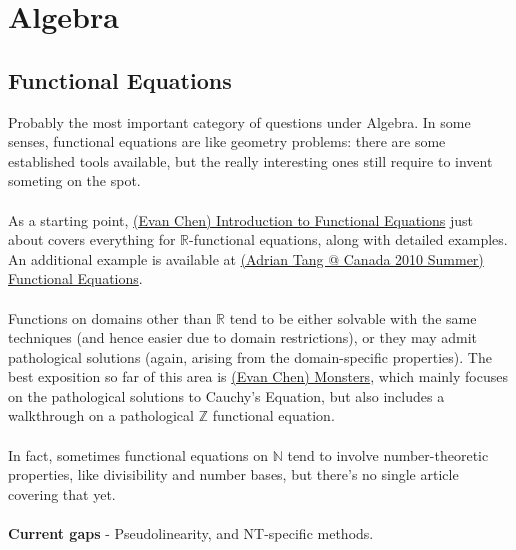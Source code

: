 \documentclass[a4paper]{article}
\begin{document}

\section{Algebra}
	
	\subsection{Functional Equations}
	Probably the most important category of questions under Algebra. In some senses, functional equations are like geometry problems: there are some established tools available, but the really interesting ones still require to invent someting on the spot.\\\\
	As a starting point, \href{run:./F_Algebra/(Evan Chen) Introduction to Functional Equations.pdf}{(Evan Chen) Introduction to Functional Equations} just about covers everything for $\mathbb{R}$-functional equations, along with detailed examples. An additional example is available at  \href{run:./F_Algebra/(Adrian Tang @ Canada 2010 Summer) Functional Equations.pdf}{(Adrian Tang @ Canada 2010 Summer) Functional Equations}.\\\\
	Functions on domains other than $\mathbb{R}$ tend to be either solvable with the same techniques (and hence easier due to domain restrictions), or they may admit pathological solutions (again, arising from the domain-specific properties). The best exposition so far of this area is \href{run:./F_Algebra/(Evan Chen) Monsters.pdf}{(Evan Chen) Monsters}, which mainly focuses on the pathological solutions to Cauchy's Equation, but also includes a walkthrough on a pathological $\mathbb{Z}$ functional equation.\\\\
	In fact, sometimes functional equations on $\mathbb{N}$ tend to involve number-theoretic properties, like divisibility and number bases, but there's no single article covering that yet.\\\\
	\textbf{Current gaps} - Pseudolinearity, and NT-specific methods.
\end{document}

